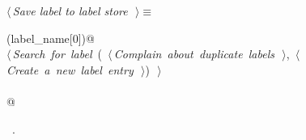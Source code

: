\documentclass{report}
\begin{document}
\begin{flushleft} \small
\begin{minipage}{\linewidth} \label{scrap245}
$\langle\,${\it Save label to label store}\nobreak\ {\footnotesize {}}$\,\rangle\equiv$
\vspace{-1ex}
\begin{list}{}{} \item
\mbox{}\verb@if (label_name[0])@\\
\mbox{}\verb@@\hbox{$\langle\,${\it Search for label}\nobreak\ ({\footnotesize \label{scrap246}
 }\mbox{}\verb@@\hbox{$\langle\,${\it Complain about duplicate labels}\nobreak\ {\footnotesize {}}$\,\rangle$}\verb@@,{\footnotesize \label{scrap247}
 }\mbox{}\verb@@\hbox{$\langle\,${\it Create a new label entry}\nobreak\ {\footnotesize {}}$\,\rangle$}\verb@@ ) {\footnotesize {}}$\,\rangle$}\verb@@\\
\mbox{}\verb@else@\\
\mbox{}@{\NWsep}
\end{list}
\vspace{-1ex}
\footnotesize\addtolength{\baselineskip}{-1ex}
\begin{list}{}{\setlength{\itemsep}{-\parsep}\setlength{\itemindent}{-\leftmargin}}
\item \NWtxtMacroRefIn\ .
\end{list}
\end{minipage}\\[4ex]
\end{flushleft}
\end{document}
